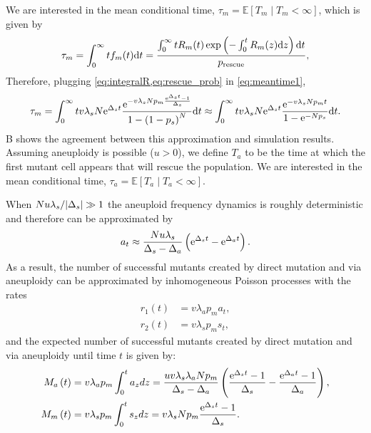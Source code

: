 \documentclass[12pt]{extarticle}
\renewcommand{\d}[1]{\ensuremath{\operatorname{d}\!{#1}}}
\renewcommand{\d}{{\rm d}}
\newcommand{\e}{{\rm e}}
\newcommand{\presc}{p_\text{rescue}}
\begin{document}
\begin{appendices}
We are interested in the mean conditional time, $\tau_m=\mathbb{E}\left[T_m \mid T_m<\infty\right]$, which is given by
\begin{equation}\label{eq:meantime1}
\begin{aligned}
\tau_m =
\int_{0}^{\infty}{t f_m(t) \d t} = 
\frac{\int_{0}^{\infty}{tR_m(t)\exp\left(-\int_0^{t}{R_m(z)\d z}\right) \d t}}{\presc},
\end{aligned}
\end{equation}
Therefore, plugging \cref{eq:integralR,eq:rescue_prob} in \cref{eq:meantime1}, 
\begin{align}\label{eq:limitapprox_appendix}
\tau_m = 
\int_0^\infty tv\lambda_s N\e^{\Delta_st}\frac{\e^{-v\lambda_s N p_m\frac{\e^{\Delta_s t}-1}{\Delta_s}} }{1-\left(1-p_s\right)^N} \d t\approx
\int_{0}^{\infty} tv\lambda_s N\e^{\Delta_st}\frac{\e^{-v\lambda_s N p_mt} }{1-\e^{-Np_s}}\d t. 
\end{align}
B shows the agreement between this approximation and simulation results. %
\\
Assuming aneuploidy is possible ($u>0$), we define $T_a$ to be the time at which the first mutant cell appears that will rescue the population. We are interested in the mean conditional time, $\tau_a=\mathbb{E}\left[T_a \mid T_a<\infty\right]$.

When $Nu\lambda_s/\abs{\Delta_s}\gg1$ the aneuploid frequency dynamics is roughly deterministic and therefore can be approximated by 
\begin{equation}\label{aneuploidpopeq}
a_t \approx \frac{Nu\lambda_s}{\Delta_s-\Delta_a}\left(\e^{\Delta_st}-\e^{\Delta_a t}\right).
\end{equation}
As a result, the number of successful mutants created by direct mutation and via aneuploidy can be approximated by inhomogeneous Poisson processes with the rates
\begin{align*}
r_1\left(t\right)&=v\lambda_ap_ma_{t},\\
r_2\left(t\right)&=v\lambda_sp_ms_{t},
\end{align*}
and the expected number of successful mutants created by direct mutation and via aneuploidy until time $t$ is given by:
\begin{align}
M_a\left(t\right)&=v\lambda_ap_m\int_0^ta_{z} d z = \frac{uv\lambda_s\lambda_aNp_m}{\Delta_s-\Delta_a}\left(\frac{\e^{\Delta_st}-1}{\Delta_s}-\frac{\e^{\Delta_at}-1}{\Delta_a}\right),\label{eq:twosteplineage}\\ 
M_m\left(t\right)&=v\lambda_sp_m\int_0^ts_{z} d z = v\lambda_sNp_m\frac{\e^{\Delta_s t}-1}{\Delta_s}.\label{eq:twosteplineagedirect}
\end{align} %


\end{appendices}
\end{document}
